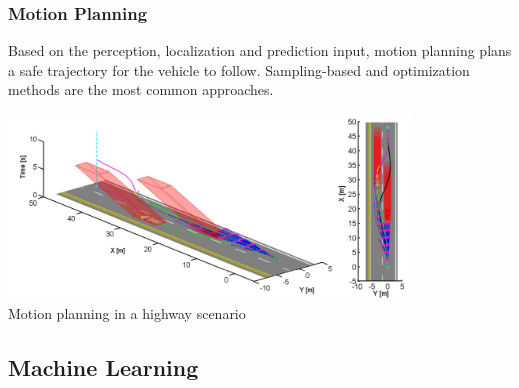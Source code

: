 {\begin{frame}
\frametitle{Motion Planning}
Based on the perception, localization and prediction input, motion planning
plans a safe trajectory for the vehicle to follow. Sampling-based and
optimization methods are the most common approaches.
\begin{center}
\includegraphics[width=0.8\textwidth]{images/ma_motionplanning.png}\\
\footnotesize{Motion planning in a highway scenario \cite{Ma2015}}
\end{center}
\end{frame}

\subsection{Machine Learning}

}

